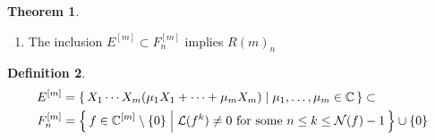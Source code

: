 \documentclass[a4paper]{article}
\theoremstyle{definition}
\newtheorem{definition}{Definition}[]
\newtheorem{theorem}[definition]{Theorem}
\newcommand{\makeset}[2]{\mleft\{\, #1 \; \middle| \; #2 \,\mright\}}
\begin{document}
\begin{theorem}
    \begin{enumerate}
        \item The inclusion \(E^{[m]} \subset F_n^{[m]}\) implies \(R(m)_n\)
    \end{enumerate}
\end{theorem}

\begin{definition}
    \begin{align*}
        E^{[m]}   & = \makeset{X_1 \cdots X_m (\mu_1 X_1 + \cdots + \mu_m X_m)}{\mu_1, \ldots, \mu_m \in \mathbb{C}} \subset                                  \\
        F^{[m]}_n & = \makeset{f \in \mathbb{C}^{[m]} \setminus \{0\}}{\mathcal{L}(f^k) \neq 0 \text{ for some } n \leq k \leq \mathcal{N}(f) - 1} \cup \{0\}
    \end{align*}
\end{definition}
\end{document}

